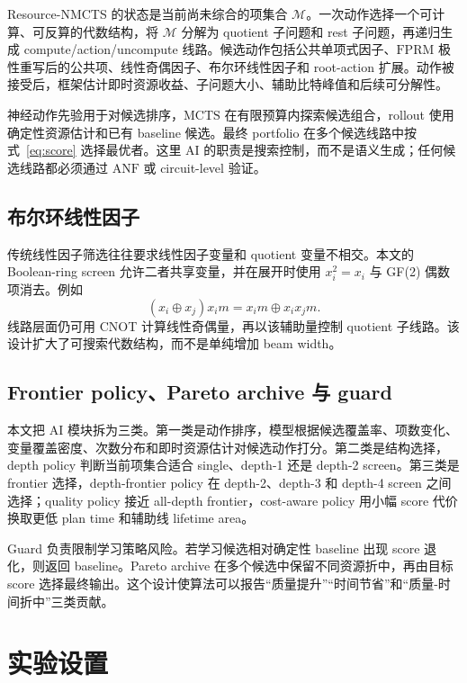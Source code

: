 \documentclass[UTF8,fontset=macnew,11pt]{ctexart}
\newcommand{\method}{Resource-NMCTS}
\newcommand{\anf}{\ensuremath{\mathrm{ANF}}}
\newcommand{\fprm}{\ensuremath{\mathrm{FPRM}}}
\newcommand{\mcts}{\ensuremath{\mathrm{MCTS}}}
\newcommand{\xor}{\ensuremath{\oplus}}
\begin{document}
\method{} 的状态是当前尚未综合的项集合 $\mathcal{M}$。一次动作选择一个可计算、可反算的代数结构，将 $\mathcal{M}$ 分解为 quotient 子问题和 rest 子问题，再递归生成 compute/action/uncompute 线路。候选动作包括公共单项式因子、\fprm{} 极性重写后的公共项、线性奇偶因子、布尔环线性因子和 root-action 扩展。动作被接受后，框架估计即时资源收益、子问题大小、辅助比特峰值和后续可分解性。

神经动作先验用于对候选排序，\mcts{} 在有限预算内探索候选组合，rollout 使用确定性资源估计和已有 baseline 候选。最终 portfolio 在多个候选线路中按式~\eqref{eq:score} 选择最优者。这里 AI 的职责是搜索控制，而不是语义生成；任何候选线路都必须通过 \anf{} 或 circuit-level 验证。

\subsection{布尔环线性因子}

传统线性因子筛选往往要求线性因子变量和 quotient 变量不相交。本文的 Boolean-ring screen 允许二者共享变量，并在展开时使用 $x_i^2=x_i$ 与 GF(2) 偶数项消去。例如
\begin{equation}
  (x_i\xor x_j)x_i m = x_i m \xor x_i x_j m .
  \label{eq:boolean-ring}
\end{equation}
线路层面仍可用 CNOT 计算线性奇偶量，再以该辅助量控制 quotient 子线路。该设计扩大了可搜索代数结构，而不是单纯增加 beam width。

\subsection{Frontier policy、Pareto archive 与 guard}

本文把 AI 模块拆为三类。第一类是动作排序，模型根据候选覆盖率、项数变化、变量覆盖密度、次数分布和即时资源估计对候选动作打分。第二类是结构选择，depth policy 判断当前项集合适合 single、depth-1 还是 depth-2 screen。第三类是 frontier 选择，depth-frontier policy 在 depth-2、depth-3 和 depth-4 screen 之间选择；quality policy 接近 all-depth frontier，cost-aware policy 用小幅 score 代价换取更低 plan time 和辅助线 lifetime area。

Guard 负责限制学习策略风险。若学习候选相对确定性 baseline 出现 score 退化，则返回 baseline。Pareto archive 在多个候选中保留不同资源折中，再由目标 score 选择最终输出。这个设计使算法可以报告“质量提升”“时间节省”和“质量-时间折中”三类贡献。

\section{实验设置}
\end{document}
